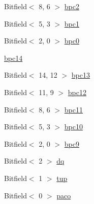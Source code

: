 \begin{DoxyCompactItemize}
Bitfield$<$ 8, 6 $>$ \hyperlink{namespaceMipsISA_a09ea43ad940d89a703c976fb61b7c5fa}{bpc2}
\item 
Bitfield$<$ 5, 3 $>$ \hyperlink{namespaceMipsISA_accda4f6fb428c55d60cb8b881f1ac918}{bpc1}
\item 
Bitfield$<$ 2, 0 $>$ \hyperlink{namespaceMipsISA_a4c091f053afee95b41f1856d1da133b9}{bpc0}
\item 
\hyperlink{namespaceMipsISA_a1806cb70ccc6d59cc1c121577e865ca0}{bpc14}
\item 
Bitfield$<$ 14, 12 $>$ \hyperlink{namespaceMipsISA_a7cf0cea0a6b278c939eb38734106c1a1}{bpc13}
\item 
Bitfield$<$ 11, 9 $>$ \hyperlink{namespaceMipsISA_a313ed0dc7e6d48dd58ab9db30a3ef8ef}{bpc12}
\item 
Bitfield$<$ 8, 6 $>$ \hyperlink{namespaceMipsISA_ae6a271f86b236430cfa0413a0c8d9e50}{bpc11}
\item 
Bitfield$<$ 5, 3 $>$ \hyperlink{namespaceMipsISA_a0cb92f59eb4b244ed607469b987321e0}{bpc10}
\item 
Bitfield$<$ 2, 0 $>$ \hyperlink{namespaceMipsISA_af89b5967055cc9764e7cd09e64a928a0}{bpc9}
\item 
Bitfield$<$ 2 $>$ \hyperlink{namespaceMipsISA_ac68f02a27ac5b77c4c280489f991c32b}{dq}
\item 
Bitfield$<$ 1 $>$ \hyperlink{namespaceMipsISA_a03a5e2158a849bce2f5bbef022f4b9e0}{tup}
\item 
Bitfield$<$ 0 $>$ \hyperlink{namespaceMipsISA_a730eba39b1e25cb11460a3f90f49aa15}{paco}
\end{DoxyCompactItemize}
